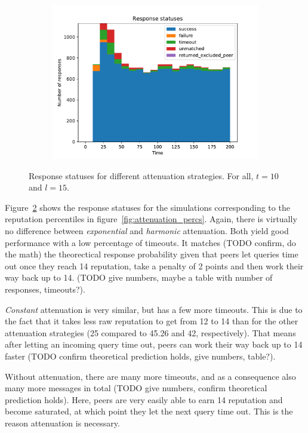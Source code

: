 \begin{figure}[t]
\begin{subfigure}[t]{0.45\columnwidth}
    \includegraphics[width=\columnwidth]{figures/attenuation_1_8_harmonic_resp_statuses}
    \label{fig:attenuation_harmonic_resp}
  \end{subfigure}
  \caption{Response statuses for different attenuation strategies. For all, $t =
  10$ and $l = 15$.}
  \label{fig:attenuation_resp}
\end{figure}

Figure~\ref{fig:attenuation_resp} shows the response statuses for the
simulations corresponding to the reputation percentiles in
figure~\ref{fig:attenuation_percs}. Again, there is virtually no difference
between \emph{exponential} and \emph{harmonic} attenuation. Both yield good
performance with a low percentage of timeouts. It matches (TODO confirm, do the
math) the theorectical response probability given that peers let queries time
out once they reach 14 reputation, take a penalty of 2 points and then work
their way back up to 14. (TODO give numbers, maybe a table with number of
responses, timeouts?).

\emph{Constant} attenuation is very similar, but has a few more timeouts. This
is due to the fact that it takes less raw reputation to get from 12 to 14 than
for the other attenuation strategies (25 compared to 45.26 and 42,
respectively). That means after letting an incoming query time out, peers can
work their way back up to 14 faster (TODO confirm theoretical prediction holds,
give numbers, table?).

Without attenuation, there are many more timeouts, and as a consequence also
many more messages in total (TODO give numbers, confirm theoretical prediction
holds). Here, peers are very easily able to earn 14 reputation and become
saturated, at which point they let the next query time out. This is the reason
attenuation is necessary.

